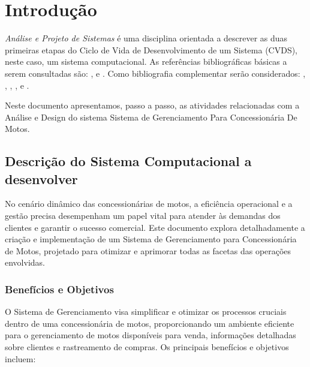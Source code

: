 

\chapter{ Introdu\c{c}\~{a}o}

\textit{An\'{a}lise e Projeto de Sistemas} \'{e} uma disciplina orientada a descrever as duas primeiras etapas do Ciclo de Vida de Desenvolvimento de um Sistema (CVDS), neste caso, um sistema computacional.  As refer\^{e}ncias bibliogr\'{a}ficas b\'{a}sicas a serem consultadas s\~{a}o: \cite{Dennis2014}, \cite{Dennis2019} \cite{Gane1983} e \cite{Sommerville2011}. Como bibliografia complementar ser\~{a}o considerados: \cite{Satzinger2012}, \cite{Shelly2012}, \cite{Valacich2020}, \cite{Kendall2020}, \cite{Budgen2021} e \cite{Engholm2013}.

Neste documento apresentamos, passo a passo,  as atividades relacionadas com a An\'{a}lise e Design do sistema Sistema de Gerenciamento Para Concessionária De Motos.


 \section{Descri\c{c}\~{a}o do Sistema Computacional a desenvolver}

No cenário dinâmico das concessionárias de motos, a eficiência operacional e a gestão precisa desempenham um papel vital para atender às demandas dos clientes e garantir o sucesso comercial. Este documento explora detalhadamente a criação e implementação de um Sistema de Gerenciamento para Concessionária de Motos, projetado para otimizar e aprimorar todas as facetas das operações envolvidas.

        \subsection{Benefícios e Objetivos} 
		O Sistema de Gerenciamento visa simplificar e otimizar os processos cruciais dentro de uma concessionária de motos, proporcionando um ambiente eficiente para o gerenciamento de motos disponíveis para venda, informações detalhadas sobre clientes e rastreamento de compras. Os principais benefícios e objetivos incluem:
		
